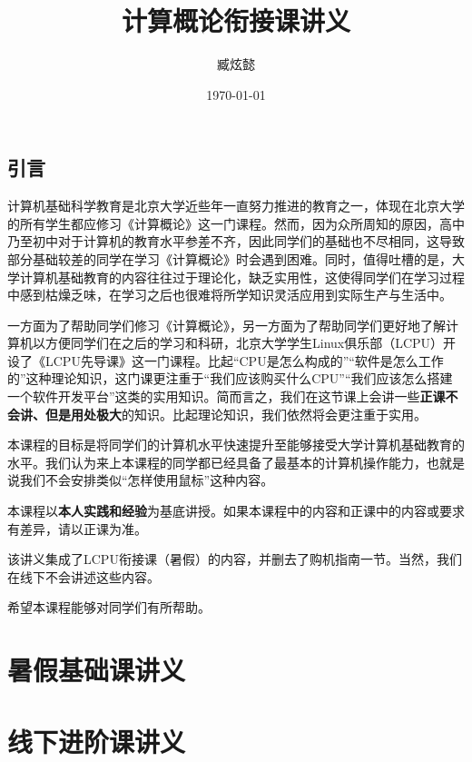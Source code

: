 \documentclass[12pt]{report}
\title{计算概论衔接课讲义}
\author{臧炫懿}
\date{\today}
\begin{document}
\maketitle

\tableofcontents

\newpage

\chapter*{引言}

计算机基础科学教育是北京大学近些年一直努力推进的教育之一，体现在北京大学的所有学生都应修习《计算概论》这一门课程。然而，因为众所周知的原因，高中乃至初中对于计算机的教育水平参差不齐，因此同学们的基础也不尽相同，这导致部分基础较差的同学在学习《计算概论》时会遇到困难。同时，值得吐槽的是，大学计算机基础教育的内容往往过于理论化，缺乏实用性，这使得同学们在学习过程中感到枯燥乏味，在学习之后也很难将所学知识灵活应用到实际生产与生活中。

一方面为了帮助同学们修习《计算概论》，另一方面为了帮助同学们更好地了解计算机以方便同学们在之后的学习和科研，北京大学学生Linux俱乐部（LCPU）开设了《LCPU先导课》这一门课程。比起“CPU是怎么构成的”“软件是怎么工作的”这种理论知识，这门课更注重于“我们应该购买什么CPU”“我们应该怎么搭建一个软件开发平台”这类的实用知识。简而言之，我们在这节课上会讲一些\textbf{正课不会讲、但是用处极大}的知识。比起理论知识，我们依然将会更注重于实用。

本课程的目标是将同学们的计算机水平快速提升至能够接受大学计算机基础教育的水平。我们认为来上本课程的同学都已经具备了最基本的计算机操作能力，也就是说我们不会安排类似“怎样使用鼠标”这种内容。

本课程以\textbf{本人实践和经验}为基底讲授。如果本课程中的内容和正课中的内容或要求有差异，请以正课为准。

该讲义集成了LCPU衔接课（暑假）的内容，并删去了购机指南一节。当然，我们在线下不会讲述这些内容。

希望本课程能够对同学们有所帮助。

\part{暑假基础课讲义}







\part{线下进阶课讲义}








\end{document}
